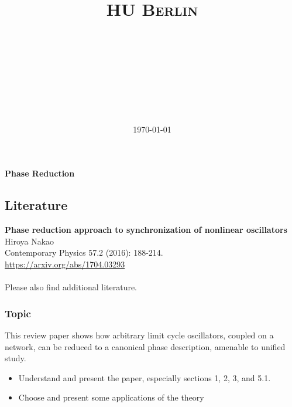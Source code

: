 \documentclass[a4paper,12pt]{article}
\title{
\vspace{2in}
\huge{\textsc{HU Berlin}\\\vspace{0.3cm}\hmwkClass}\\
\horrule{0.5pt} \\[0.4cm] %
\huge{\textmd{\textbf{\ \hmwkTitle}}}\\
\horrule{2pt} \\[0.5cm] %
\vspace{3in}
}
\author{\Large{\textbf{\hmwkAuthorName}}}
\date{\today} %
\newcommand{\hmwkTitle}{Phase Reduction} %
\newcommand{\hmwkDueDate}{} %
\begin{document}



\vspace*{1mm}
\begin{center}
    {\LARGE\textbf{\hmwkTitle}}\\
   \hmwkDueDate
\end{center}

\subsection*{Literature}
\textbf{Phase reduction approach to synchronization of nonlinear oscillators}\\
Hiroya Nakao\\
Contemporary Physics 57.2 (2016): 188-214.\\
\url{https://arxiv.org/abs/1704.03293}\\
\\

Please also find additional literature.

\subsubsection*{Topic}

This review paper shows how arbitrary limit cycle oscillators, coupled on a network, can be reduced to a canonical phase description, amenable to unified study.

\small{
\begin{itemize}
\item Understand and present the paper, especially sections 1, 2, 3, and 5.1.
\item Choose and present some applications of the theory
\end{itemize}}
\end{document}

